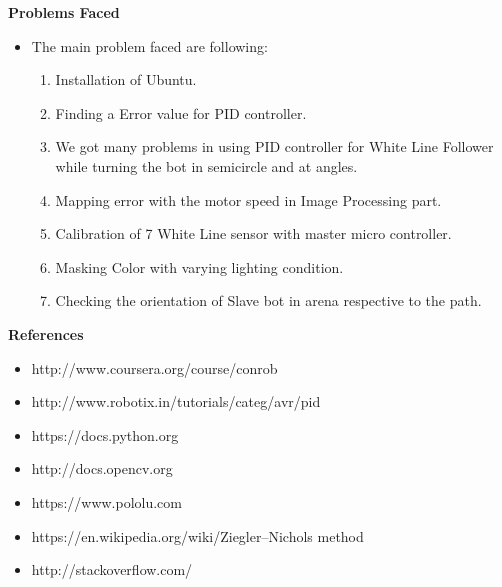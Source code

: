 \documentclass[report]{res}
\begin{document}
	\pagebreak
	
	
	\begin{center}
		{\huge\textbf{Problems Faced}\par}
	\end{center}
	
	\begin{itemize}
		\item The main problem faced are following:
		\begin{enumerate}
			\item Installation of Ubuntu.
			\item Finding a Error value for PID controller.
			\item We got many problems in using PID controller for White Line Follower while turning the bot in semicircle and at angles.
			\item Mapping error with the motor speed in Image Processing part.
			\item Calibration of 7 White Line sensor with master micro controller.
			\item Masking Color with varying lighting condition.
			\item Checking the orientation of Slave bot in arena respective to the path.
		\end{enumerate}
	\end{itemize}
	
	\pagebreak
	
	
	\begin{center}
		{\huge\textbf{References}\par}
	\end{center}
	
	\begin{itemize}
		
		\item http://www.coursera.org/course/conrob
		\item http://www.robotix.in/tutorials/categ/avr/pid
		\item https://docs.python.org
		\item http://docs.opencv.org
		\item https://www.pololu.com
		\item https://en.wikipedia.org/wiki/Ziegler–Nichols method
		\item http://stackoverflow.com/
		
	\end{itemize}
	
\end{document}
